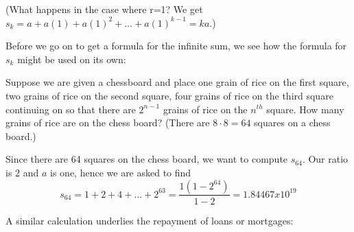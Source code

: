 (What happens in the case where r=1?
We get $s_{k}= a + a(1) + a(1)^{2} + \ldots + a(1)^{k-1}=ka$.)
\medskip

Before we go on to get a formula for the infinite sum, we see
how the formula for $s_{k}$ might be used on its own:
\begin{Example}
Suppose we are given a chessboard and place one grain of rice on
the first square, two grains of rice on the second square, four
grains of rice on the third square continuing on so that there are
$2^{n-1}$ grains of rice on the $n^{th}$ square.  How many grains of
rice are on the chess board? (There are $8\cdot 8=64$ squares on a chess
board.) 

\solution
Since there are 64 squares on the chess board, we want to compute
$s_{64}$.  Our ratio is 2 and $a$ is one, hence we are asked to find
\[
s_{64}=1+2+4+ \ldots +2^{63} =
\frac{1(1-2^{64})}{1-2} = 1.84467 x 10^{19}
\]
\end{Example}

A similar calculation underlies the repayment of loans or mortgages:

